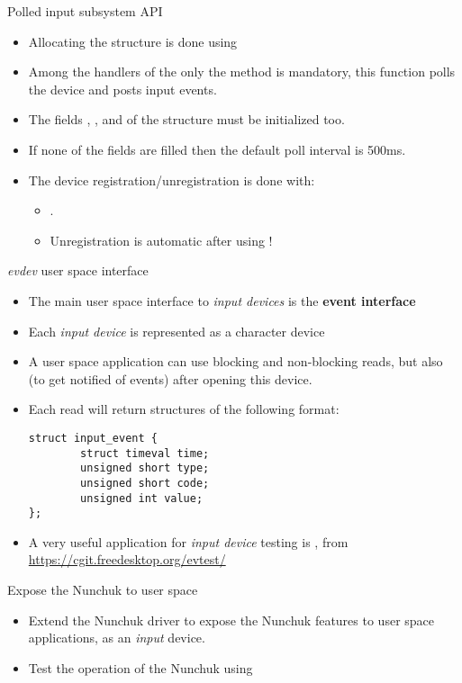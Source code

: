 \begin{frame}[fragile]{Polled input subsystem API}
  \begin{itemize}
  \item Allocating the  structure is
    done using 
  \item Among the handlers of the  only the
     method is mandatory, this function polls the device
    and posts input events.
  \item The fields , ,  and  of
    the  structure must be initialized too.
  \item If none of the  fields are filled then the
    default poll interval is 500ms.
  \item The device registration/unregistration is done with:
    \begin{itemize}
    \item {}.
    \item Unregistration is automatic after using
      !
    \end{itemize}
  \end{itemize}
\end{frame}

\begin{frame}[fragile]{{\em evdev} user space interface}
  \begin{itemize}
  \item The main user space interface to {\em input devices} is the
    {\bf event interface}
  \item Each {\em input device} is represented as a
     character device
  \item A user space application can use blocking and non-blocking
    reads, but also  (to get notified of events) after
    opening this device.
  \item Each read will return  structures of the
    following format:
    \begin{block}{}
    \begin{verbatim}
struct input_event {
        struct timeval time;
        unsigned short type;
        unsigned short code;
        unsigned int value;
};
\end{verbatim}
\end{block}
\item A very useful application for {\em input device} testing is
  , from \url{https://cgit.freedesktop.org/evtest/}
  \end{itemize}
\end{frame}

\setuplabframe
{Expose the Nunchuk to user space}
{
  \begin{itemize}
  \item Extend the Nunchuk driver to expose the Nunchuk features to
    user space applications, as an {\em input} device.
  \item Test the operation of the Nunchuk using 
  \end{itemize}
}
